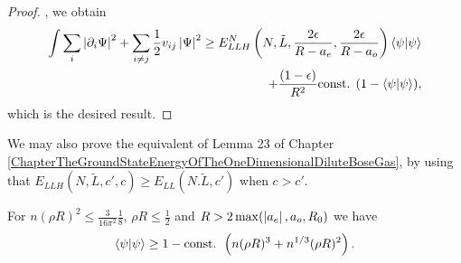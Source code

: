\begin{proof}
	
, we obtain\begin{equation*}
	\begin{aligned}
	\int \sum_{i}\left\lvert \partial_i\Psi \right\rvert^2+\sum_{i\neq j} \frac{1}{2}v_{ij}\left\lvert \Psi \right\rvert^2\geq E_{LLH}^N \left(N,\tilde{L},\frac{2\epsilon}{R-a_e},\frac{2\epsilon}{R-a_o}\right)\left\langle\psi|\psi\right\rangle\\+ \frac{(1-\epsilon)}{R^2}\textnormal{const. }(1-\left\langle\psi|\psi\right\rangle),
	\end{aligned}
	\end{equation*}
	which is the desired result.
\end{proof}
We may also prove the equivalent of Lemma 23 of Chapter \ref{ChapterTheGroundStateEnergyOfTheOneDimensionalDiluteBoseGas}, by using that $ E_{LLH}(N,\tilde{L},c',c)\geq E_{LL}(N.\tilde{L},c') $ when $ c>c' $.
	\begin{lemma}\label{LemmaImprovedMassBoundSpin1/2Fermi}
	For $ n(\rho R)^2\leq  \frac{3}{16\pi^2}\frac{1}{8} $, $ \rho R\leq \frac{1}{2} $ and $ R>2\max(\left\lvert a_e \right\rvert,a_o,R_0) $ we have
	\begin{equation}\label{EqImprovedMassBoundSpin1/2Fermi}
	\begin{aligned}
	\left\langle\psi|\psi\right\rangle \geq 1-\textnormal{const. }\left(n(\rho R)^3+n^{1/3}(\rho R)^2\right).
	\end{aligned}
	\end{equation}
\end{lemma}
